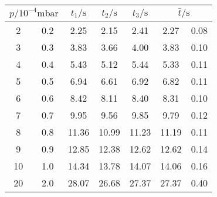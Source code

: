 \label{tab:tabTL4}
	\begin{tabular}{S[table-format=2.0] @{${}\pm{}$} S[table-format=1.1]S[table-format=2.2]S[table-format=2.2]S[table-format=2.2]S[table-format=2.2] @{${}\pm{}$} S[table-format=1.2]}
		\toprule
		 & {$t_1/\si{\second}$} & {$t_2/\si{\second}$} & {$t_3/\si{\second}$} &  \\
		 & 0.2 & 2.25 & 2.15 & 2.41 & 2.27 & 0.08 \\
		 3 & 0.3 & 3.83 & 3.66 & 4.00 & 3.83 & 0.10 \\
		 4 & 0.4 & 5.43 & 5.12 & 5.44 & 5.33 & 0.11 \\
		 5 & 0.5 & 6.94 & 6.61 & 6.92 & 6.82 & 0.11 \\
		 6 & 0.6 & 8.42 & 8.11 & 8.40 & 8.31 & 0.10 \\
		 7 & 0.7 & 9.95 & 9.56 & 9.85 & 9.79 & 0.12 \\
		 8 & 0.8 & 11.36 & 10.99 & 11.23 & 11.19 & 0.11 \\
		 9 & 0.9 & 12.85 & 12.38 & 12.62 & 12.62 & 0.14 \\
		10 & 1.0 & 14.34 & 13.78 & 14.07 & 14.06 & 0.16 \\
		20 & 2.0 & 28.07 & 26.68 & 27.37 & 27.37 & 0.40 \\
		\bottomrule
	\end{tabular}
